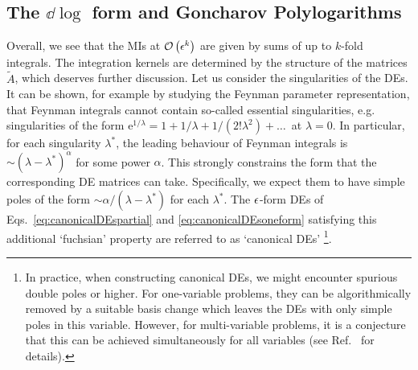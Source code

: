 \documentclass[main.tex]{subfiles}
\begin{document}
\subsection{The $\dd \log$ form and Goncharov Polylogarithms} \label{sec:DEdlogform}
Overall, we see that the MIs at $\mathcal{O}\left(\epsilon^k\right)$ are given by sums of up to $k$-fold integrals. The integration kernels are determined by the structure of the matrices $\tilde{A}$, which deserves further discussion. Let us consider the singularities of the DEs. It can be shown, for example by studying the Feynman parameter representation, that Feynman integrals cannot contain so-called essential singularities, e.g. singularities of the form $\mathrm{e}^{1/\lambda} = 1+ 1/\lambda + 1/(2!\lambda^2)+\ldots\,$ at $\lambda=0$. In particular, for each singularity $\lambda^\ast$, the leading behaviour of Feynman integrals is $\sim (\lambda- \lambda^\ast)^\alpha$ for some power $\alpha$. This strongly constrains the form that the corresponding DE matrices can take\cite{Henn:2014qga}. Specifically, we expect them to have simple poles of the form $\sim \alpha/(\lambda-\lambda^\ast)$ for each $\lambda^\ast$. The $\epsilon$-form DEs of Eqs.~\ref{eq:canonicalDEspartial} and \ref{eq:canonicalDEsoneform} satisfying this additional `fuchsian' property are referred to as `canonical DEs' \footnote{In practice, when constructing canonical DEs, we might encounter spurious double poles or higher. For one-variable problems, they can be algorithmically removed by a suitable basis change which leaves the DEs with only simple poles in this variable. However, for multi-variable problems, it is a conjecture that this can be achieved simultaneously for all variables (see Ref.~\cite{Dlapa:2022nct} for details).}.
\end{document}
